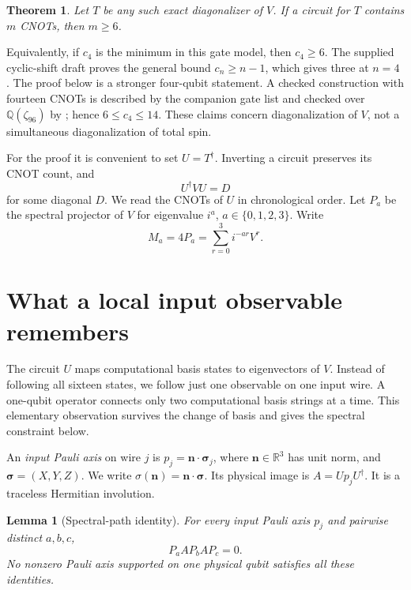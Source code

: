 \documentclass[11pt]{article}
\newtheorem{theorem}{Theorem}
\newtheorem{lemma}{Lemma}
\begin{document}
\begin{theorem}\label{thm:main}
Let $T$ be any such exact diagonalizer of $V$.  If a circuit for $T$ contains
$m$ CNOTs, then $m\geq6$.
\end{theorem}

Equivalently, if $c_4$ is the minimum in this gate model, then
$c_4\geq6$.  The supplied cyclic-shift draft proves the general bound
$c_n\geq n-1$, which gives three at $n=4$ \cite[Theorem~2]{cycle-draft}.
The proof below is a stronger four-qubit statement.  A checked construction
with fourteen CNOTs is described by the companion gate list
 and checked over
$\mathbb Q(\zeta_{96})$ by ; hence
$6\leq c_4\leq14$.  These claims concern diagonalization of $V$, not a
simultaneous diagonalization of total spin.

For the proof it is convenient to set $U=T^\dagger$.  Inverting a circuit
preserves its CNOT count, and
\begin{equation}\label{eq:diagonal}
U^\dagger VU=D
\end{equation}
for some diagonal $D$.  We read the CNOTs of $U$ in chronological order.
Let $P_a$ be the spectral projector of $V$ for eigenvalue $i^a$,
$a\in\{0,1,2,3\}$.  Write
\begin{equation}\label{eq:projector}
M_a=4P_a=\sum_{r=0}^{3}i^{-ar}V^r.
\end{equation}

\section{What a local input observable remembers}

The circuit $U$ maps computational basis states to eigenvectors of $V$.
Instead of following all sixteen states, we follow just one observable
on one input wire. A one-qubit operator connects only two computational
basis strings at a time. This elementary observation survives the change
of basis and gives the spectral constraint below.

An \emph{input Pauli axis} on wire $j$ is
$p_j=\mathbf n\cdot\boldsymbol\sigma_j$, where
$\mathbf n\in\mathbb R^3$ has unit norm, and $\boldsymbol\sigma=(X,Y,Z)$.
We write $\sigma(\mathbf n)=\mathbf n\cdot\boldsymbol\sigma$. Its physical image is
$A=Up_jU^\dagger$.  It is a traceless Hermitian involution.

\begin{lemma}[Spectral-path identity]\label{lem:path}
For every input Pauli axis $p_j$ and pairwise distinct $a,b,c$,
\begin{equation}\label{eq:path}
P_a A P_b A P_c=0.
\end{equation}
No nonzero Pauli axis supported on one physical qubit satisfies all these
identities.
\end{lemma}
\end{document}
